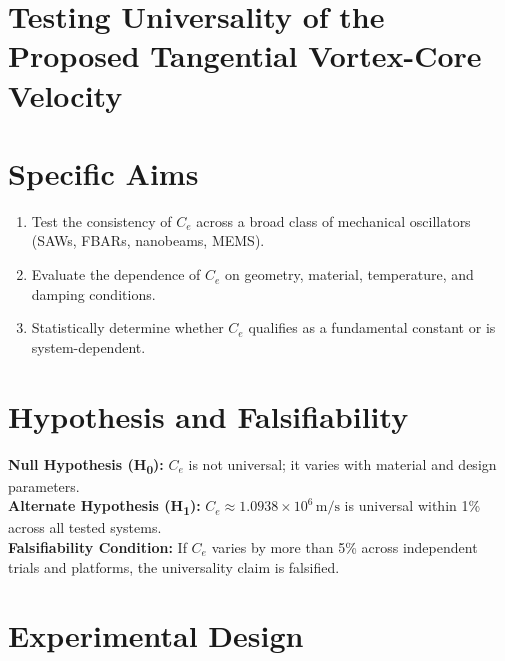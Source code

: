 %
%
    \section{\textbf{Testing Universality of the Proposed Tangential Vortex-Core Velocity}}
        \section*{Specific Aims}
        \begin{enumerate}[label=\textbf{Aim \arabic*.}]
            \item Test the consistency of \( C_e \) across a broad class of mechanical oscillators (SAWs, FBARs, nanobeams, MEMS).
            \item Evaluate the dependence of \( C_e \) on geometry, material, temperature, and damping conditions.
            \item Statistically determine whether \( C_e \) qualifies as a fundamental constant or is system-dependent.
        \end{enumerate}

        \section*{Hypothesis and Falsifiability}
        \textbf{Null Hypothesis (H\textsubscript{0}):} \( C_e \) is not universal; it varies with material and design parameters.\\
        \textbf{Alternate Hypothesis (H\textsubscript{1}):} \( C_e \approx 1.0938 \times 10^6 \, \text{m/s} \) is universal within 1\% across all tested systems.\\

        \noindent\textbf{Falsifiability Condition:} If \( C_e \) varies by more than 5\% across independent trials and platforms, the universality claim is falsified.

        \section*{Experimental Design}


